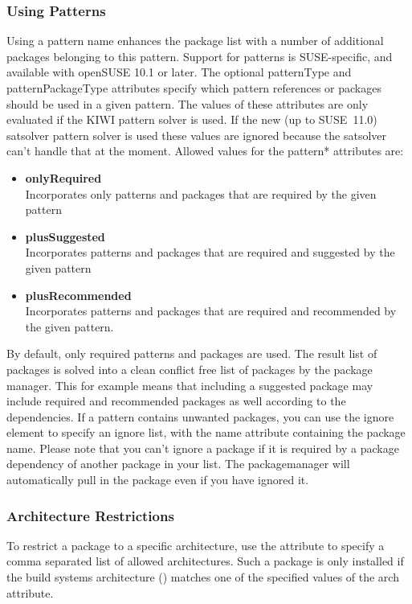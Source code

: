 \subsubsection{Using Patterns}
Using a pattern name enhances the package list with a number of
additional packages belonging to this pattern. Support for patterns
is SUSE-specific, and available with open\-SUSE 10.1 or later.
The optional patternType and patternPackageType attributes specify
which pattern references or packages should be used in a given pattern.
The values of these attributes are only evaluated if the KIWI pattern
solver is used. If the new (up to SUSE~11.0) satsolver pattern solver
is used these values are ignored because the satsolver can't handle
that at the moment. Allowed values for the pattern* attributes are:

\begin{itemize}
\item \textbf{onlyRequired}\\
      Incorporates only patterns and packages that are required by the
      given pattern
\item \textbf{plusSuggested}\\
      Incorporates patterns and packages that are required
      and suggested by the given pattern
\item \textbf{plusRecommended}\\
      Incorporates patterns and packages that are required and
      recommended by the given pattern.
\end{itemize}

By default, only required patterns and packages are used. The result
list of packages is solved into a clean conflict free list of packages
by the package manager. This for example means that including a suggested
package may include required and recommended packages as well according
to the dependencies. If a pattern contains unwanted packages, you can use
the ignore element to specify an ignore list, with the name attribute
containing the package name. Please note that you can't ignore a package
if it is required by a package dependency of another package in your list.
The packagemanager will automatically pull in the package even if you have
ignored it.

\subsubsection{Architecture Restrictions}
To restrict a package to a specific architecture, use
the  attribute to specify a comma separated list of allowed
architectures. Such a package is only installed if the build systems
architecture () matches one of the specified values of the arch
attribute.

